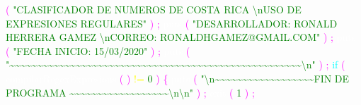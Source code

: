\textcolor{magenta}{(} 
\textcolor{green}{"CLASIFICADOR DE NUMEROS DE COSTA RICA \textbackslash nUSO DE EXPRESIONES REGULARES"} 
\textcolor{magenta}{)} 
\textcolor{magenta}{;} 
\textcolor{white}{puts} 
\textcolor{magenta}{(} 
\textcolor{green}{"DESARROLLADOR: RONALD HERRERA GAMEZ \textbackslash nCORREO: RONALDHGAMEZ@GMAIL.COM"} 
\textcolor{magenta}{)} 
\textcolor{magenta}{;} 
\textcolor{white}{puts} 
\textcolor{magenta}{(} 
\textcolor{green}{"FECHA INICIO: 15/03/2020"} 
\textcolor{magenta}{)} 
\textcolor{magenta}{;} 
\textcolor{white}{puts} 
\textcolor{magenta}{(} 
\textcolor{green}{"\textasciitilde \textasciitilde \textasciitilde \textasciitilde \textasciitilde \textasciitilde \textasciitilde \textasciitilde \textasciitilde \textasciitilde \textasciitilde \textasciitilde \textasciitilde \textasciitilde \textasciitilde \textasciitilde \textasciitilde \textasciitilde \textasciitilde \textasciitilde \textasciitilde \textasciitilde \textasciitilde \textasciitilde \textasciitilde \textasciitilde \textasciitilde \textasciitilde \textasciitilde \textasciitilde \textasciitilde \textasciitilde \textasciitilde \textasciitilde \textasciitilde \textasciitilde \textasciitilde \textasciitilde \textasciitilde \textasciitilde \textasciitilde \textasciitilde \textasciitilde \textasciitilde \textasciitilde \textasciitilde \textasciitilde \textasciitilde \textasciitilde \textasciitilde \textasciitilde \textasciitilde \textasciitilde \textbackslash n"} 
\textcolor{magenta}{)} 
\textcolor{magenta}{;} 
\textcolor{cyan}{if} 
\textcolor{magenta}{(} 
\textcolor{white}{compilarRegexExpresions} 
\textcolor{magenta}{(} 
\textcolor{magenta}{)} 
\textcolor{yellow}{!=} 
\textcolor{green}{0} 
\textcolor{magenta}{)} 
\textcolor{magenta}{\{} 
\textcolor{white}{puts} 
\textcolor{magenta}{(} 
\textcolor{green}{"\textbackslash n\textasciitilde \textasciitilde \textasciitilde \textasciitilde \textasciitilde \textasciitilde \textasciitilde \textasciitilde \textasciitilde \textasciitilde \textasciitilde \textasciitilde \textasciitilde \textasciitilde \textasciitilde \textasciitilde \textasciitilde \textasciitilde  FIN DE PROGRAMA \textasciitilde \textasciitilde \textasciitilde \textasciitilde \textasciitilde \textasciitilde \textasciitilde \textasciitilde \textasciitilde \textasciitilde \textasciitilde \textasciitilde \textasciitilde \textasciitilde \textasciitilde \textasciitilde \textasciitilde \textasciitilde \textbackslash n\textbackslash n"} 
\textcolor{magenta}{)} 
\textcolor{magenta}{;} 
\textcolor{white}{exit} 
\textcolor{magenta}{(} 
\textcolor{green}{1} 
\textcolor{magenta}{)} 
\textcolor{magenta}{;} 
